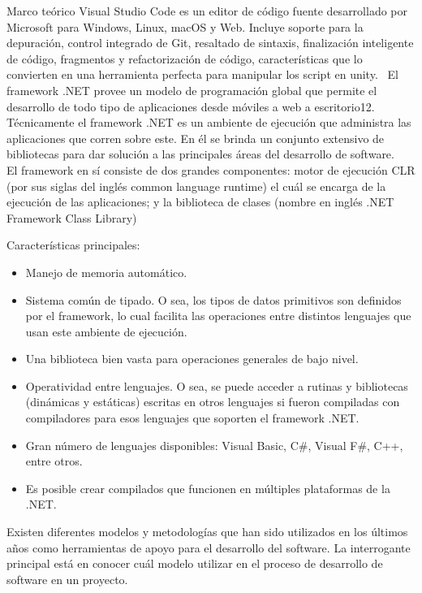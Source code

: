 \begin{thesischapter}{1} {Marco teórico}
    Visual Studio Code es un editor de código fuente desarrollado por Microsoft para
    Windows, Linux, macOS y Web. Incluye soporte para la depuración, control
    integrado de Git, resaltado de sintaxis, finalización inteligente de código, fragmentos
    y refactorización de código, características que lo convierten en una herramienta
    perfecta para manipular los script en unity.~\cite{vscode}
    El framework .NET provee un modelo de programación global que permite el
    desarrollo de todo tipo de aplicaciones desde móviles a web a escritorio12.
    Técnicamente el framework .NET es un ambiente de ejecución que administra las
    aplicaciones que corren sobre este. En él se brinda un conjunto extensivo de
    bibliotecas para dar solución a las principales áreas del desarrollo de software.\\
    El framework en sí consiste de dos grandes componentes: motor de ejecución CLR
    (por sus siglas del inglés common language runtime) el cuál se encarga de la
    ejecución de las aplicaciones; y la biblioteca de clases (nombre en inglés .NET
    Framework Class Library)~\cite{netframework}

    \vspace{2pt}
    Características principales:
    \begin{itemize}
        \item Manejo de memoria automático.
        \item Sistema común de tipado. O sea, los tipos de datos primitivos son definidos por el framework, lo cual facilita las operaciones entre distintos lenguajes que usan este ambiente de ejecución.
        \item Una biblioteca bien vasta para operaciones generales de bajo nivel.
        \item Operatividad entre lenguajes. O sea, se puede acceder a rutinas y bibliotecas (dinámicas y estáticas) escritas en otros lenguajes si fueron compiladas con compiladores para esos lenguajes que soporten el framework .NET.
        \item Gran número de lenguajes disponibles: Visual Basic, C\#, Visual F\#, C++, entre otros.
        \item Es posible crear compilados que funcionen en múltiples plataformas de la .NET.
    \end{itemize}

    Existen diferentes modelos y metodologías que han sido utilizados en los últimos años como 
    herramientas de apoyo para el desarrollo del software. La interrogante principal está en 
    conocer cuál modelo utilizar en el proceso de desarrollo de software en un proyecto.~\cite{DELGADOOLIVERA2021}
    

\end{thesischapter}
